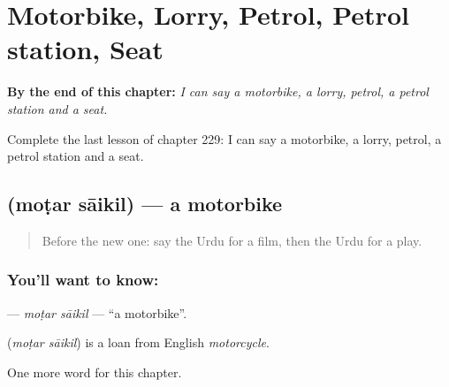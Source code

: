 
\chapter{Motorbike, Lorry, Petrol, Petrol station, Seat}
\label{ch:ur-motorbike-lorry-petrol-petrol-station-seat}

\begin{chapteropening}
\textbf{By the end of this chapter:} \emph{I can say a motorbike, a lorry, petrol, a petrol station and a seat.}

Complete the last lesson of chapter 229: I can say a motorbike, a lorry, petrol, a petrol station and a seat.
\end{chapteropening}

\section[\texorpdfstring{\ur{موٹر} \ur{سائیکل} (moṭar sāikil)}{موٹر سائیکل (moṭar sāikil)}]{  (moṭar sāikil) — a motorbike}

\label{lesson:UR-C229-motar-saikil}



\begin{quote}
Before the new one: say the Urdu for a film, then the Urdu for a play.
\end{quote}

\subsection*{You'll want to know:  }
\textbf{ } — \emph{moṭar sāikil} — \textquotedblleft{}a motorbike\textquotedblright{}.

\begin{cousinweb}
\textbf{ } (\emph{moṭar sāikil}) is a loan from English \emph{motorcycle}.
\end{cousinweb}

\begin{grammarlens}[title={What you've built}]
One more word for this chapter.
\end{grammarlens}

